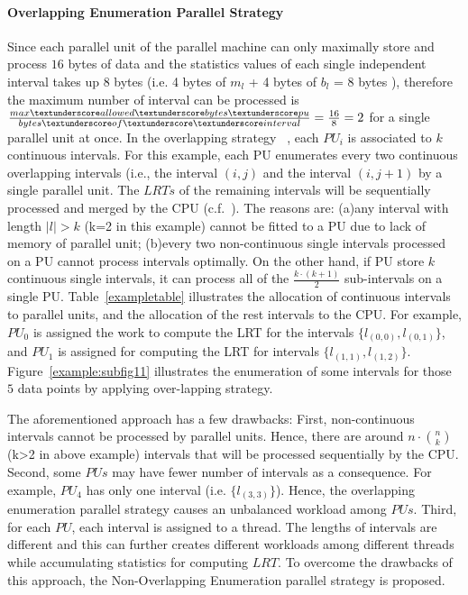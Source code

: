 \documentclass[AMA,LATO1COL]{WileyNJD-v2}
\begin{document}
\paragraph{Overlapping Enumeration Parallel Strategy}
Since each parallel unit of the parallel machine can only maximally store and process $16$ bytes of data and the statistics values of each single independent interval takes up $8$ bytes (i.e. 4 bytes of $m_l$ + 4 bytes of $b_l$ = 8 bytes ), therefore the maximum number of interval can be processed is $\frac{max\textunderscore allowed \textunderscore bytes\textunderscore pu }{bytes\textunderscore of\textunderscore \textunderscore interval}=\frac{16}{8}=2$ for a single parallel unit at once. In the overlapping strategy ~\cite{apweb}, each $PU_i$ is associated to $k$ continuous intervals. For this example, each PU enumerates every two continuous overlapping intervals (i.e., the interval $(i,j)$ and the interval $(i,j+1)$ by a single parallel unit.  The $LRTs$ of the remaining intervals will be sequentially processed and merged by the CPU (c.f.~\cite{apweb}). The reasons are: (a)any interval with length $|l|>k$ (k=2 in this example) cannot be fitted to a PU due to lack of memory of parallel unit; (b)every two non-continuous single intervals processed on a PU cannot process intervals optimally. On the other hand, if PU store $k$ continuous single intervals, it can process all of the ${\frac{k \cdot (k+1)}{2}}$ sub-intervals on a single PU. Table~\ref{exampletable} illustrates the allocation of continuous intervals to parallel units, and the allocation of the rest intervals to the CPU.  For example, $PU_0$ is assigned the work to compute the LRT for the intervals $\{l_{(0,0)},l_{(0,1)}\}$, and $PU_1$ is assigned for computing the LRT for intervals $\{l_{(1,1)},l_{(1,2)}\}$. Figure~\ref{example:subfig11} illustrates the enumeration of some intervals for those $5$ data points by applying over-lapping strategy.

The aforementioned approach has a few drawbacks: First, non-continuous intervals cannot be processed by parallel units. Hence, there are around $n\cdot {n \choose k}$ (k>2 in above example) intervals that will be processed sequentially by the CPU. Second, some $PUs$ may have fewer number of intervals as a consequence. For example, $PU_4$ has only one interval (i.e. $\{l_{(3,3)}\}$). Hence, the overlapping enumeration parallel strategy causes an unbalanced workload among $PUs$.  Third, for each $PU$, each interval is assigned to a thread. The lengths of intervals are different and this can further creates different workloads among different threads while accumulating statistics for computing $LRT$. To overcome the drawbacks of this approach, the Non-Overlapping Enumeration parallel strategy is proposed.
\end{document}
